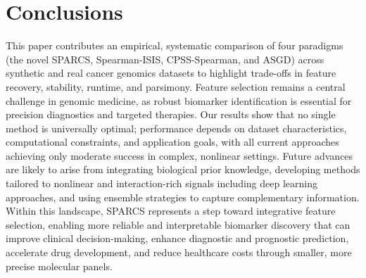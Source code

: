\documentclass[11pt]{article}
\begin{document}
\section{Conclusions}

This paper contributes an empirical, systematic comparison of four paradigms (the novel SPARCS,
Spearman-ISIS, CPSS-Spearman, and ASGD) across synthetic and real cancer genomics datasets to
highlight trade-offs in feature recovery, stability, runtime, and parsimony. Feature selection
remains a central challenge in genomic medicine, as robust biomarker identification is essential for
precision diagnostics and targeted therapies. Our results show that no single method is universally
optimal; performance depends on dataset characteristics, computational constraints, and application
goals, with all current approaches achieving only moderate success in complex, nonlinear settings.
Future advances are likely to arise from integrating biological prior knowledge, developing methods
tailored to nonlinear and interaction-rich signals including deep learning approaches, and using
ensemble strategies to capture complementary information. Within this landscape, SPARCS represents a
step toward integrative feature selection, enabling more reliable and interpretable biomarker
discovery that can improve clinical decision-making, enhance diagnostic and prognostic prediction,
accelerate drug development, and reduce healthcare costs through smaller, more precise molecular
panels.
\end{document}
